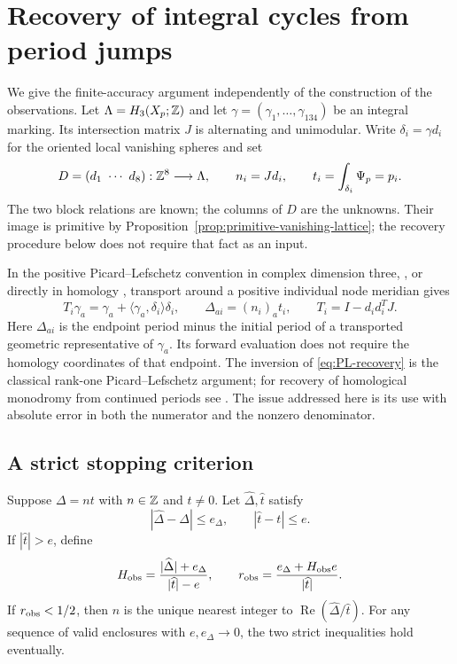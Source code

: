 \section{Recovery of integral cycles from period jumps}
\label{sec:integral-recovery}

We give the finite-accuracy argument independently of the construction
of the observations. Let $\Lambda=H_3(X_p;\mathbb Z)$ and let
$\gamma=(\gamma_1,\ldots,\gamma_{134})$ be an integral marking.
Its intersection matrix $J$ is alternating and unimodular. Write
$\delta_i=\gamma d_i$ for the oriented local vanishing spheres and
set
\begin{equation}\label{eq:unknown-map}
 D=(d_1\ \cdots\ d_8):\mathbb Z^8\longrightarrow\Lambda,
 \qquad n_i=Jd_i,\qquad t_i=\int_{\delta_i}\Psi_p=p_i.
\end{equation}
The two block relations are known; the columns of $D$ are the
unknowns. Their image is primitive by
Proposition~\ref{prop:primitive-vanishing-lattice}; the recovery
procedure below does not require that fact as an input.

In the positive Picard--Lefschetz convention in complex dimension three,
\cite[Expos\'e~XIV, Theorem~3.2.11]{Deligne}, or directly in homology
\cite[equation~(8) in the arXiv-v2 text]{LPPV},
transport around a positive individual node meridian gives
\begin{equation}\label{eq:PL-recovery}
 T_i\gamma_a=\gamma_a+\langle\gamma_a,\delta_i\rangle\delta_i,
 \qquad \Delta_{ai}=(n_i)_a t_i,
 \qquad T_i=I-d_id_i^TJ.
\end{equation}
Here $\Delta_{ai}$ is the endpoint period minus the initial period
of a transported geometric representative of $\gamma_a$. Its forward
evaluation does not require the homology coordinates of that endpoint.
The inversion of \eqref{eq:PL-recovery} is the classical rank-one
Picard--Lefschetz argument; for recovery of homological monodromy from
continued periods see \cite[\S3.5.2, equation~(38), arXiv-v2 text]{LPPV}.
The issue addressed here is its use with
absolute error in both the numerator and the nonzero denominator.

\subsection{A strict stopping criterion}

\begin{lemma}\label{lem:integer-separation}
Suppose $\Delta=nt$ with $n\in\mathbb Z$ and $t\ne0$. Let
$\widehat\Delta,\widehat t$ satisfy
\[
 |\widehat\Delta-\Delta|\le e_\Delta,
 \qquad |\widehat t-t|\le e.
\]
If $|\widehat t|>e$, define
\begin{equation}\label{eq:observed-height}
 H_{\rm obs}=\frac{|\widehat\Delta|+e_\Delta}
                        {|\widehat t|-e},
 \qquad
 r_{\rm obs}=\frac{e_\Delta+H_{\rm obs}e}{|\widehat t|}.
\end{equation}
If $r_{\rm obs}<1/2$, then $n$ is the unique nearest integer to
$\operatorname{Re}(\widehat\Delta/\widehat t)$.
For any sequence of valid enclosures with $e,e_\Delta\to0$,
the two strict inequalities hold eventually.
\end{lemma}

